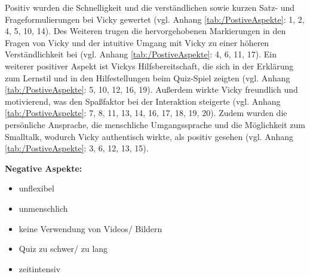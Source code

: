 Positiv wurden die Schnelligkeit und die verständlichen sowie kurzen Satz- und Frageformulierungen bei Vicky gewertet (vgl. Anhang \ref{tab:/PostiveAspekte}: 1, 2, 4, 5, 10, 14).
Des Weiteren trugen die hervorgehobenen Markierungen in den Fragen von Vicky und der intuitive Umgang mit Vicky zu einer höheren Verständlichkeit bei (vgl. Anhang \ref{tab:/PostiveAspekte}: 4, 6, 11, 17). 
Ein weiterer positiver Aspekt ist Vickys Hilfsbereitschaft, die sich in der Erklärung zum Lernstil und in den Hilfestellungen beim Quiz-Spiel zeigten (vgl. Anhang \ref{tab:/PostiveAspekte}: 5, 10, 12, 16, 19).
Außerdem wirkte Vicky freundlich und motivierend, was den Spaßfaktor bei der Interaktion steigerte (vgl. Anhang \ref{tab:/PostiveAspekte}: 7, 8, 11, 13, 14, 16, 17, 18, 19, 20).
Zudem wurden die persönliche Ansprache, die menschliche Umgangssprache und die Möglichkeit zum Smalltalk, wodurch Vicky authentisch wirkte, als positiv gesehen (vgl. Anhang \ref{tab:/PostiveAspekte}: 3, 6, 12, 13, 15).

\pagebreak

\textbf{Negative Aspekte:}

\begin{minipage}[t]{0.5\textwidth}
    \begin{itemize}
    \item unflexibel
    \item unmenschlich
    \item keine Verwendung von Videos/ Bildern \\
\end{itemize}
\end{minipage}
\hfill
\begin{minipage}[t]{0.5\textwidth}
\begin{itemize}
   \item Quiz zu schwer/ zu lang
    \item zeitintensiv\\

\end{itemize}
\end{minipage}

